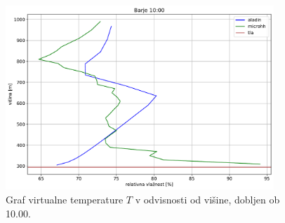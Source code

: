 \documentclass[mat2, tisk]{fmfdelo}
\begin{document}
\begin{figure}[h!]
  \centering
  \includegraphics[width=0.9\textwidth]{rezultati/rh_barje_long_5.pdf}
  \caption{Graf virtualne temperature $T$ v odvisnosti od višine, dobljen 
  ob 10.00.}
  \label{fig:barje_T5}
\end{figure}
\end{document}
